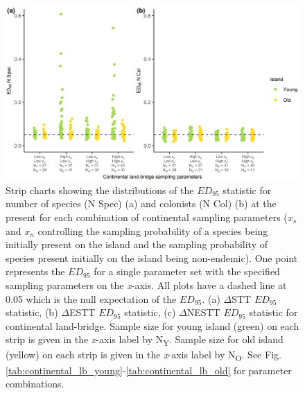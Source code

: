 \begin{figure}
    \centering
    \includegraphics{continental_land_bridge_sample_spec_col_facet_.png}
    \caption{Strip charts showing the distributions of the $ED_{95}$ statistic for number of species (N Spec) (a) and colonists (N Col) (b) at the present for each combination of continental sampling parameters ($x_s$ and $x_n$ controlling the sampling probability of a species being initially present on the island and the sampling probability of species present initially on the island being non-endemic). One point represents the $ED_{95}$ for a single parameter set with the specified sampling parameters on the \textit{x}-axis. All plots have a dashed line at 0.05 which is the null expectation of the $ED_{95}$. (a) $\Delta$STT $ED_{95}$ statistic, (b) $\Delta$ESTT $ED_{95}$ statistic, (c) $\Delta$NESTT $ED_{95}$ statistic for continental land-bridge. Sample size for young island (green) on each strip is given in the \textit{x}-axis label by N\textsubscript{Y}. Sample size for old island (yellow) on each strip is given in the \textit{x}-axis label by N\textsubscript{O}. See Fig. \ref{tab:continental_lb_young}-\ref{tab:continental_lb_old} for parameter combinations.}
    \label{fig:continental_land_bridge_sample_spec_col_facet_}
\end{figure}

